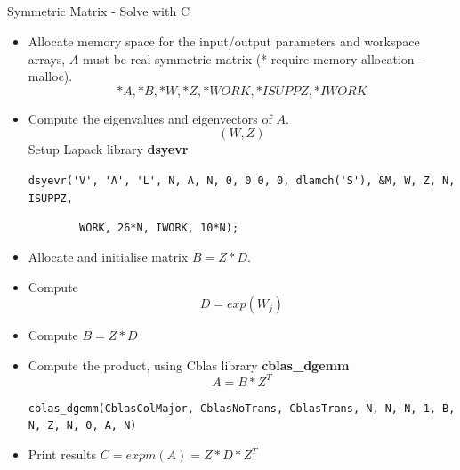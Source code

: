 \documentclass[xcolor=x11names,compress]{beamer}
\renewcommand{\(}{\begin{columns}}
\renewcommand{\)}{\end{columns}}
\newcommand{\<}[1]{\begin{column}{#1}}
\renewcommand{\>}{\end{column}}
\begin{document}
\subsection{}
\begin{frame}[fragile]{Symmetric Matrix - Solve with C}
\begin{scriptsize}
\begin{itemize}
 \item Allocate memory space for the input/output parameters and workspace arrays, $A$ must be real symmetric matrix  (* require memory allocation -  malloc).
 \[*A, *B, *W, *Z, *WORK, *ISUPPZ, *IWORK \]
 \item Compute the eigenvalues and eigenvectors of $A$. 
 \[(W, Z)\]
 Setup Lapack library \textbf{dsyevr}
\begin{tiny}\verb+dsyevr('V', 'A', 'L', N, A, N, 0, 0 0, 0, dlamch('S'), &M, W, Z, N, ISUPPZ,+\end{tiny}
\begin{tiny}\verb+        WORK, 26*N, IWORK, 10*N);+\end{tiny}
 \item Allocate and initialise matrix $B = Z*D$. 
 \item Compute \[D = exp(W_j)\]
 \item Compute  $B = Z*D$
 \item Compute the product, using Cblas library \textbf{cblas\_dgemm} \[A = B*Z^T \]  
\begin{tiny} \verb+cblas_dgemm(CblasColMajor, CblasNoTrans, CblasTrans, N, N, N, 1, B, N, Z, N, 0, A, N)+\end{tiny}
 \item Print results $C = expm(A) = Z*D*Z^T $
\end{itemize}\end{scriptsize}
\end{frame}
\end{document}
